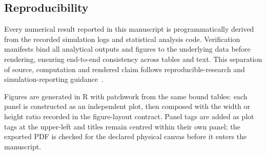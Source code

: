 \subsection{Reproducibility}

Every numerical result reported in this manuscript is programmatically derived
from the recorded simulation logs and statistical analysis code. Verification
manifests bind all analytical outputs and figures to the underlying data before
rendering, ensuring end-to-end consistency across tables and text. This
separation of source, computation and rendered claim follows reproducible-research
and simulation-reporting guidance~\cite{peng2011repro,sandve2013repro,
monks2019stress,ozturk2025mrtasim}.

Figures are generated in R with patchwork from the same bound tables: each panel
is constructed as an independent plot, then composed with the width or height
ratio recorded in the figure-layout contract. Panel tags are added as plot tags at
the upper-left and titles remain centred within their own panel; the exported PDF
is checked for the declared physical canvas before it enters the manuscript.
